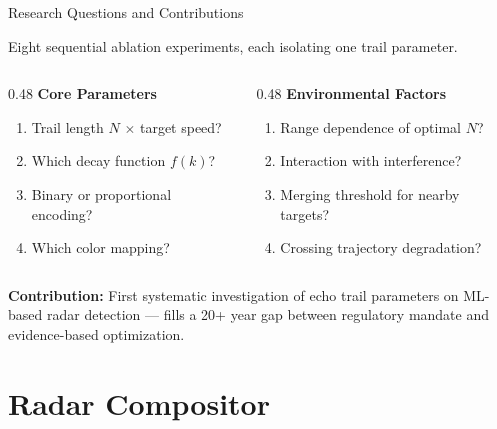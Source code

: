 \documentclass[aspectratio=169, 10pt]{beamer}
\begin{document}
\begin{frame}{Research Questions and Contributions}

Eight sequential ablation experiments, each isolating one trail parameter.

\vspace{0.3cm}

\begin{columns}[T]
\begin{column}{0.48\textwidth}
  \textcolor{Garnet}{\textbf{Core Parameters}}
  \begin{enumerate}
    \item[\textbf{A1}] Trail length $N$ $\times$ target speed?
    \item[\textbf{A2}] Which decay function $f(k)$?
    \item[\textbf{A3}] Binary or proportional encoding?
    \item[\textbf{A4}] Which color mapping?
  \end{enumerate}
\end{column}
\begin{column}{0.48\textwidth}
  \textcolor{Atlantic}{\textbf{Environmental Factors}}
  \begin{enumerate}
    \item[\textbf{A5}] Range dependence of optimal $N$?
    \item[\textbf{A6}] Interaction with interference?
    \item[\textbf{A7}] Merging threshold for nearby targets?
    \item[\textbf{A8}] Crossing trajectory degradation?
  \end{enumerate}
\end{column}
\end{columns}

\vspace{0.5cm}

\textbf{Contribution:} First systematic investigation of echo trail parameters
on ML-based radar detection --- fills a 20+ year gap between regulatory mandate
and evidence-based optimization.

\end{frame}

\section{Radar Compositor}
\end{document}
